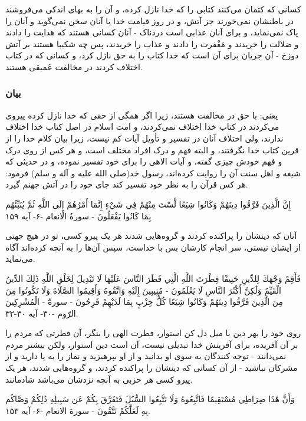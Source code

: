 کسانی که کتمان می‌کنند کتابی را که خدا نازل کرده، و آن را به بهای اندکی
می‌فروشند در باطنشان نمی‌خورند جز آتش، و در روز قیامت خدا با آنان سخن
نمی‌گوید و آنان را پاک نمی‌نماید، و برای آنان عذابی است دردناک - آنان
کسانی هستند که هدایت را دادند و ضلالت را خریدند و مَغْفرت را دادند و
عذاب را خریدند، پس چه شکیبا هستند بر آتش دوزخ - آن جریان برای آن است
که خدا کتاب را به حق نازل کرد، و کسانی که در کتاب اختلاف کردند در
مخالفت عَمیقی هستند.

\subsubsection*{بیان}

یعنی: با حق در مخالفت هستند، زیرا اگر همگی از حقی که خدا نازل کرده
پیروی می‌کردند در کتاب خدا اختلاف نمی‌کردند، و امت اسلام در اصل کتاب خدا
اختلاف ندارند، ولی اختلاف آنان در تفسیر و تأویل آیات کم نیست، زیرا
بیان کلام خدا را از قرین کتاب خدا نگرفتند، و البته فهم و درک افراد
مختلف است، و هر کس از روی درک و فهم خودش چیزی گفته، و آیات الاهی را
برای خود تفسیر نموده، و در حدیثی که شیعه و اهل سنت آن را روایت
کرده‌اند، رسول خد(صلی الله علیه و آله و سلم) فرمود: هر کس قرآن را به
نظر خود تفسیر کند جای خود را در آتش جهنم گیرد.

إِنَّ الَّذِينَ فَرَّقُوا دِينَهُمْ وَكَانُوا شِيَعًا لَّسْتَ مِنْهُمْ فِي شَيْءٍ إِنَّمَا أَمْرُهُمْ إِلَى اللَّهِ
ثُمَّ يُنَبِّئُهُم بِمَا كَانُوا يَفْعَلُونَ - سورةُ الْانعام -۶- آیه ۱۵۹

آنان که دینشان را پراکنده کردند و گروه‌هایی شدند هر یک پیرو کسی، تو در
هیچ جهتی از ایشان نیستی، سر انجام کارشان بس با خداست، سپس آن‌ها را به
آنچه کرده‌اند آگاه می‌نماید.

فَأَقِمْ وَجْهَكَ لِلدِّينِ حَنِيفًا فِطْرَتَ اللَّهِ الَّتِي فَطَرَ النَّاسَ عَلَيْهَا لَا تَبْدِيلَ لِخَلْقِ
اللَّهِ ذَٰلِكَ الدِّينُ الْقَيِّمُ وَلَٰكِنَّ أَكْثَرَ النَّاسِ لَا يَعْلَمُونَ -‏ مُنِيبِينَ إِلَيْهِ وَاتَّقُوهُ
وَأَقِيمُوا الصَّلَاةَ وَلَا تَكُونُوا مِنَ الْمُشْرِكِينَ ‎- مِنَ الَّذِينَ فَرَّقُوا دِينَهُمْ وَكَانُوا
شِيَعًا كُلُّ حِزْبٍ بِمَا لَدَيْهِمْ فَرِحُونَ - سورةُ الرّوم -۳۰- آیه ۳۰-۳۲.

روی خود را بهر دین با میل دل کن استوار، فطرت الهی را بنگر، آن فطرتی که
مردم را بر آن آفریده، برای آفرینش خدا تبدیلی نیست، آن است دین استوار،
ولکن بیشتر مردم نمی‌دانند - توجه کنندگان به سوی او بدانید و از او
بپرهیزید و نماز را به پا دارید و از مشرکان نباشید - از آن کسانی که
دینشان را پراکنده کردند، و گروه‌هایی شدند، هر یک پیرو کسی هر حزبی به
آنچه نزدشان می‌باشد شادمانند.

وَأَنَّ هَٰذَا صِرَاطِي مُسْتَقِيمًا فَاتَّبِعُوهُ وَلَا تَتَّبِعُوا السُّبُلَ فَتَفَرَّقَ بِكُمْ عَن سَبِيلِهِ ذَٰلِكُمْ
وَصَّاكُم بِهِ لَعَلَّكُمْ تَتَّقُونَ - سورة الانعام -۶- آیه ۱۵۳.

